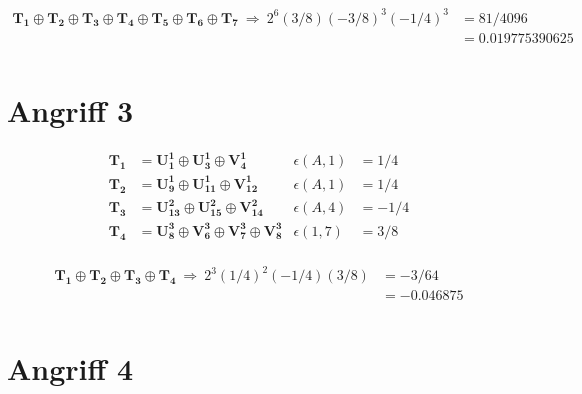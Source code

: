 \begin{equation*}
\begin{aligned}
    \mathbf{T_1} \oplus{} \mathbf{T_2} \oplus{} \mathbf{T_3} \oplus{} \mathbf{T_4} \oplus{} \mathbf{T_5} \oplus{} \mathbf{T_6} \oplus{} \mathbf{T_7} \
    \Rightarrow \ 2^6(3/8)(-3/8)^3(-1/4)^3 &= 81/4096 \\ 
    &= 0.019775390625\\
\end{aligned}
\end{equation*}

\section*{Angriff 3}

\begin{equation*}
\begin{aligned}
    \mathbf{T_1} &= \mathbf{U^1_1} \oplus{} \mathbf{U^1_3} \oplus{} \mathbf{V^1_4}                          & \epsilon(A,1) &= 1/4 \\
    \mathbf{T_2} &= \mathbf{U^1_9} \oplus{} \mathbf{U^1_{11}} \oplus{} \mathbf{V^1_{12}}                    & \epsilon(A,1) &= 1/4 \\
    \mathbf{T_3} &= \mathbf{U^2_{13}} \oplus{} \mathbf{U^2_{15}} \oplus{} \mathbf{V^2_{14}}                 & \epsilon(A,4) &= -1/4 \\
    \mathbf{T_4} &= \mathbf{U^3_8} \oplus{} \mathbf{V^3_6} \oplus{} \mathbf{V^3_7} \oplus{} \mathbf{V^3_8}  & \epsilon(1,7) &= 3/8 \\
\end{aligned}
\end{equation*}

\begin{equation*}
\begin{aligned}
    \mathbf{T_1} \oplus{} \mathbf{T_2} \oplus{} \mathbf{T_3} \oplus{} \mathbf{T_4} \
    \Rightarrow \ 2^3(1/4)^2(-1/4)(3/8) &= -3/64 \\ 
    &= -0.046875\\
\end{aligned}
\end{equation*}

\section*{Angriff 4}

